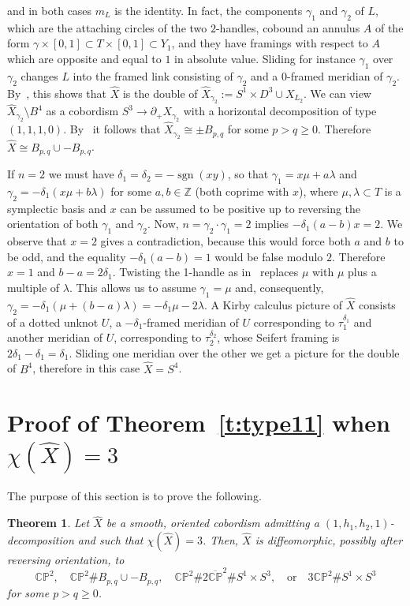 \documentclass[11pt,a4paper]{amsart}
\newcommand{\CP}{\mathbb{CP}}
\newcommand{\de}{\delta}
\newcommand{\ga}{\gamma}
\newcommand{\la}{\lambda}
\newcommand{\x}{\times}
\newcommand{\del}{\partial}
\DeclareMathOperator{\sgn}{sgn}
\newtheorem{thm}{Theorem}[section]
\theoremstyle{definition}
\numberwithin{equation}{section}
\begin{document}
and in both cases $m_L$ is the identity. In fact, the components $\ga_1$ and $\ga_2$ of $L$, 
which are the attaching circles of the two $2$-handles, cobound an annulus $A$ of 
the form $\ga\x [0,1]\subset T\x [0,1]\subset Y_1$, 
and they have framings with respect to $A$ which are opposite and equal to $1$ in absolute value. 
Sliding for instance $\ga_1$ over $\ga_2$ changes $L$ into the framed link consisting of $\ga_2$ and 
a $0$-framed meridian of $\ga_2$. By~\cite[Example~4.6.3]{GS}, this shows that $\hat X$ is the double of 
$\hat X_{\ga_2} := S^1\x D^3\cup X_{L_2}$. We can view $\hat X_{\ga_2}\setminus B^4$ as a cobordism $S^3\to\del_+ X_{\ga_2}$
with a horizontal decomposition of type $(1,1,1,0)$. By~\cite[Proposition~3.1]{LP22-2} it follows that 
$\hat X_{\ga_2}\cong\pm B_{p,q}$ for some $p>q\geq 0$. Therefore $\hat X\cong B_{p,q}\cup -B_{p,q}$.

If $n=2$ we must have $\de_1=\de_2=-\sgn(xy)$, so that $\ga_1=x \mu + a \la$ and  
$\ga_2=-\de_1 (x \mu+b \la)$ for some $a,b \in \mathbb{Z}$ (both coprime with $x$), 
where $\mu,\la\subset T$ is a symplectic basis and 
$x$ can be assumed to be positive up to reversing the orientation of both $\ga_1$ and $\ga_2$. 
Now, $n=\ga_2 \cdot \ga_1=2$ implies $-\de_1 (a-b)x=2$. We observe that $x=2$ gives a contradiction, 
because this would force both $a$ and $b$ to be odd, and the equality $-\de_1 (a -b)=1$ would be 
false modulo $2$. Therefore $x=1$ and $b-a=2\de_1$. Twisting the 1-handle as in~\cite[Figure~3]{LP22-2} 
replaces $\mu$ with $\mu$ plus a multiple of $\la$. This allows us to assume $\ga_1=\mu$ and, 
consequently, $\ga_2=-\de_1(\mu+(b-a)\la)=-\de_1 \mu-2\la$. A Kirby calculus picture of $\hat X$ 
consists of a dotted unknot $U$, a $-\de_1$-framed meridian of $U$ corresponding to 
$\tau_1^{\de_1}$ and another meridian of $U$, corresponding to $\tau_2^{\de_2}$, whose 
Seifert framing is $2\de_1 - \de_1 = \de_1$. Sliding one meridian over the other 
we get a picture for the double of $B^4$, therefore in this case $\hat X = S^4$. 

\section{Proof of Theorem~\ref{t:type11} when $\chi(\hat X)=3$}\label{s:chi=3}

The purpose of this section is to prove the following.

\begin{thm}\label{t:chi=3}
Let $\hat X$ be a smooth, oriented cobordism admitting a $(1,h_1,h_2,1)$-decomposition and such that $\chi(\hat X)=3$. 
Then, $\hat X$ is diffeomorphic, possibly after reversing orientation, to 
\[
\CP^2,\quad \CP^2\# B_{p,q}\cup -B_{p,q},\quad \CP^2\# 2\overline{\CP}^2\# S^1\x S^3, 
\quad\text{or}\quad 3\CP^2\#  S^1\x S^3
\]
for some $p>q\geq 0$.
\end{thm} 
\end{document}
